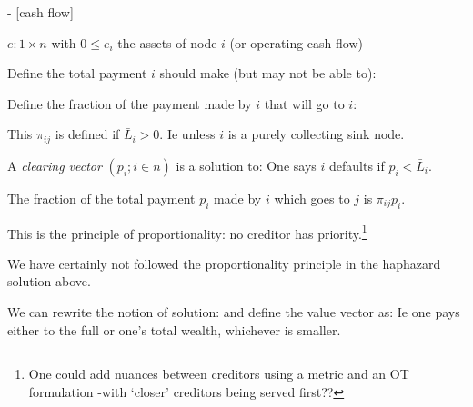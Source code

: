 \documentclass[oneside]{article}
\begin{document}
- [cash flow] 

$e:1\times n$ with $0\leq e_i$ the assets of node $i$ (or operating cash flow)

Define the total payment $i$ should make (but may not be able to):

Define
the fraction of the payment made by $i$ that will go to $i$:

This $\pi_{ij}$ 
is defined if $\bar L_i >0$. Ie unless $i$ is a purely collecting sink node. 



\newpage

\DE
A \emph{clearing vector} $(p_i;i\in n)$ is a solution to:
\ED
One says $i$ defaults if $p_i < \bar L_i$.

The fraction of the total payment $p_i$ made by $i$ 
which goes to $j$ is $\pi_{ij}p_i$. 

This is the principle of proportionality: no creditor has priority.\footnote{One could add nuances between creditors using a metric and an OT formulation -with `closer' creditors being served first??} 



\CV[1]
We have certainly not followed the proportionality principle in 
the haphazard solution above.



%
We can rewrite the notion of solution:
and define the value vector as:
Ie one pays either to the full or one's total wealth, whichever is smaller.
\end{document}
